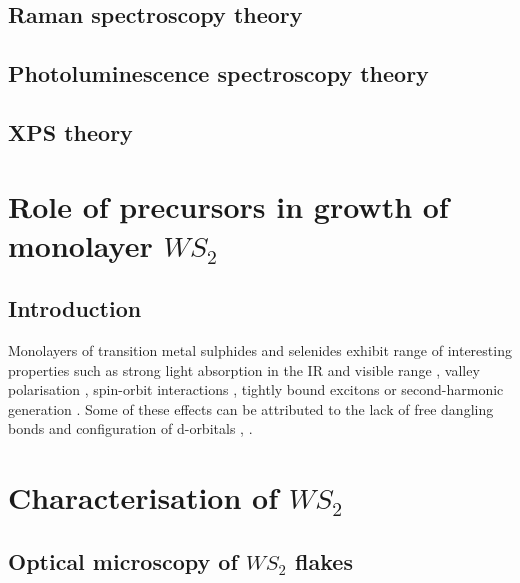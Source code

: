 \documentclass[12pt]{article}
\begin{document}
	\subsection{Raman spectroscopy theory}
	\subsection{Photoluminescence spectroscopy theory}
	\subsection{XPS theory}
	
\section{Role of precursors in growth of monolayer $WS_2$}
	\subsection{Introduction}
	
Monolayers of transition metal sulphides and selenides exhibit range of interesting properties such as strong light absorption in the IR and visible range \cite{AtomicallyThinMoS2ANewDirect-GapSemiconductor}\cite{ExtraordinarySunlightAbsorptionAndOneNanometerThickPhotovoltaicsUsingTwo-DimensionalMonolayerMaterials}\cite{EvolutionOfElectronicStructureInAtomicallyThinSheetsOfWS2AndWSe2}, valley polarisation \cite{ControlOfValleyPolarizationInMonolayerMoS2ByOpticalHelicity} \cite{ValleyPolarizationInMoS2MonolayersByOpticalPumping}, spin-orbit interactions \cite{CoupledSpinAndValleyPhysicsInMonolayersOfMoS2AndOtherGroup-VIDichalcogenides}\cite{GiantSpin-orbit-inducedSpinSplittingInTwo-dimensionalTransition-metalDichalcogenideSemiconductors}, tightly bound excitons \cite{TightlyBoundTrionsInMonolayer} or second-harmonic generation \cite{ProbingSymmetryPropertiesOfFew-LayerMoS2Andh-BNByOpticalSecond-HarmonicGeneration}. Some of these effects can be attributed to the lack of free dangling bonds and configuration of d-orbitals \cite{TheTransitionMetalDichalcogenidesDiscussionAndInterpretationOfTheObservedOpticalElectricalAndStructuralProperties}, \cite{ElectronicPropertiesOfMoS2Nanoparticles}.
\section{Characterisation of $WS_2$}
	\subsection{Optical microscopy of $WS_2$ flakes}
\end{document}
